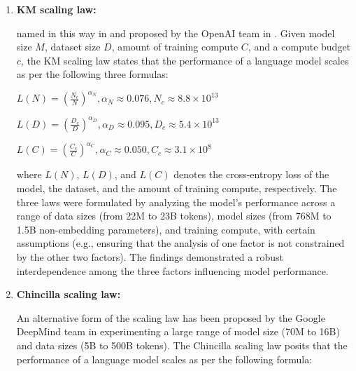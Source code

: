 \begin{enumerate}
    \item \textbf{KM scaling law:} {named in this way in \cite{survey} and proposed by the OpenAI team in \cite{scaling1}. Given model size $M$, dataset size $D$, amount of training compute $C$, and a compute budget $c$, the KM scaling law states that the performance of a language model scales as per the following three formulas:

        \begin{center}
            \begin{math}
                L(N)=(\frac{N_c}{N})^{\alpha_N}, \alpha_N \approx 0.076, N_c \approx 8.8 \times 10^{13}
            \end{math}
        \end{center}

        \begin{center}
            \begin{math}
                L(D)=(\frac{D_c}{D})^{\alpha_D}, \alpha_D \approx 0.095, D_c \approx 5.4 \times 10^{13}
            \end{math}
        \end{center}

        \begin{center}
            \begin{math}
                L(C)=(\frac{C_c}{C})^{\alpha_C}, \alpha_C \approx 0.050, C_c \approx 3.1 \times 10^8
            \end{math}
        \end{center}

        where $L(N)$, $L(D)$, and $L(C)$ denotes the cross-entropy loss of the model, the dataset, and the amount of training compute, respectively.
        The three laws were formulated by analyzing the model's performance across a range of data sizes (from 22M to 23B tokens), model sizes (from 768M to 1.5B non-embedding parameters), and training compute, with certain assumptions (e.g., ensuring that the analysis of one factor is not constrained by the other two factors).
        The findings demonstrated a robust interdependence among the three factors influencing model performance.
    }
    \item \textbf{Chincilla scaling law:} {An alternative form of the scaling law has been proposed by the Google DeepMind team in \cite{scaling2} experimenting a large range of model size (70M to 16B) and data sizes (5B to 500B tokens).
    The Chincilla scaling law posits that the performance of a language model scales as per the following formula:

}
\end{enumerate}
